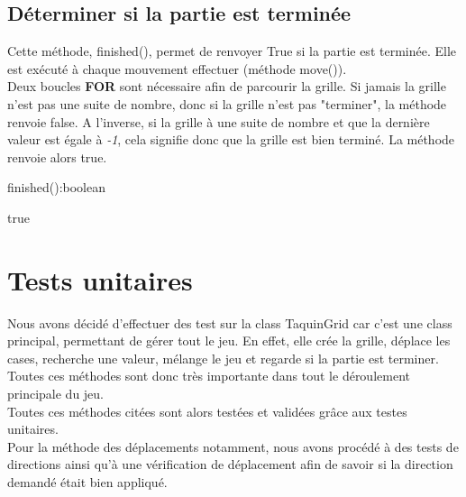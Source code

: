 		\subsection{Déterminer si la partie est terminée}

			Cette méthode, finished(), permet de renvoyer True si la partie est terminée. Elle est exécuté à chaque mouvement effectuer (méthode move()).\\
			Deux boucles \textbf{FOR} sont nécessaire afin de parcourir la grille. Si jamais la grille n'est pas une suite de nombre, donc si la grille n'est pas "terminer", la méthode renvoie false. A l'inverse, si la grille à une suite de nombre et que la dernière valeur est égale à \textit{-1}, cela signifie donc que la grille est bien terminé. La méthode renvoie alors true.\\

			\begin{algorithm}[H]
				\caption{finished():boolean}
				\Return true
			\end{algorithm}



	\section{Tests unitaires}
		Nous avons décidé d'effectuer des test sur la class TaquinGrid car c'est une class principal, permettant de gérer tout le jeu. En effet, elle crée la grille, déplace les cases, recherche une valeur, mélange le jeu et regarde si la partie est terminer. Toutes ces méthodes sont donc très importante dans tout le déroulement principale du jeu.\\
		Toutes ces méthodes citées sont alors testées et validées grâce aux testes unitaires.\\
		Pour la méthode des déplacements notamment, nous avons procédé à des tests de directions ainsi qu'à une vérification de déplacement afin de savoir si la direction demandé était bien appliqué.

		
